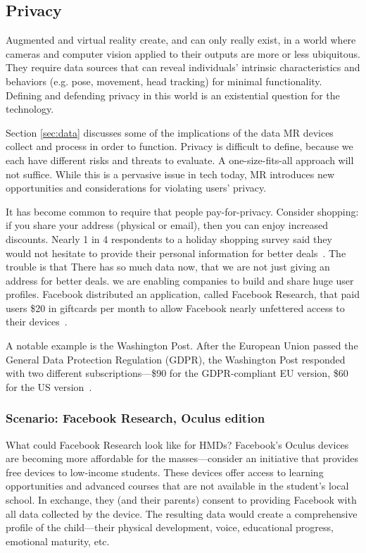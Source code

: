

\subsection{Privacy}
Augmented and virtual reality create, and can only really exist, in a world where cameras and computer vision applied to their outputs are more or less ubiquitous. They require data sources that can reveal individuals' intrinsic characteristics and behaviors (e.g. pose, movement, head tracking) for minimal functionality. Defining and defending privacy in this world is an existential question for the technology.

Section \ref{sec:data} discusses some of the implications of the data MR devices collect and process in order to function. Privacy is difficult to define, because we each have different risks and threats to evaluate. A one-size-fits-all approach will not suffice. While this is a pervasive issue in tech today, MR introduces new opportunities and considerations for violating users' privacy.

It has become common to require that people pay-for-privacy. Consider shopping: if you share your address (physical or email), then you can enjoy increased discounts. Nearly 1 in 4 respondents to a holiday shopping survey said they would not hesitate to provide their personal information for better deals~\cite{moses}. The trouble is that There has so much data now, that we are not just giving an address for better deals. we are enabling companies to build and share huge user profiles. Facebook distributed an application, called Facebook Research, that paid users \$20 in giftcards per month to allow Facebook nearly unfettered access to their devices~\cite{axon}.

A notable example is the Washington Post. After the European Union passed the General Data Protection Regulation (GDPR), the Washington Post responded with two different subscriptions---\$90 for the GDPR-compliant EU version, \$60 for the US version~\cite{karl}.

\subsubsection{Scenario: Facebook Research, Oculus edition}

What could Facebook Research look like for HMDs? Facebook's Oculus devices are becoming more affordable for the masses---consider an initiative that provides free devices to low-income students. These devices offer access to learning opportunities and advanced courses that are not available in the student's local school. In exchange, they (and their parents) consent to providing Facebook with all data collected by the device. The resulting data would create a comprehensive profile of the child---their physical development, voice, educational progress, emotional maturity, etc.

